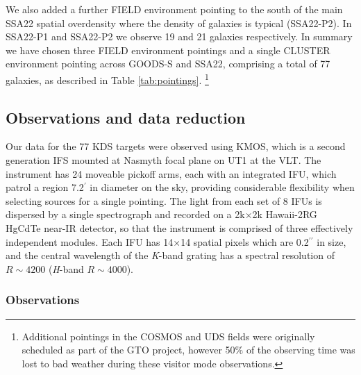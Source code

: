 \documentclass[fleqn,usenatbib]{mn2e}
\begin{document}
We also added a further FIELD environment pointing to the south of the main SSA22 spatial overdensity where the density of galaxies is typical (SSA22-P2).
In SSA22-P1 and SSA22-P2 we observe 19 and 21 galaxies respectively.
In summary we have chosen three FIELD environment pointings and a single CLUSTER environment pointing across GOODS-S and SSA22, comprising a total of 77 galaxies, as described in Table \ref{tab:pointings}. \footnote{Additional pointings in the COSMOS and UDS fields were originally scheduled as part of the GTO project, however 50$\%$ of the observing time was lost to bad weather during these visitor mode observations.}

\subsection{Observations and data reduction}\label{subsubsec:observations_and_dr}

Our data for the 77 KDS targets were observed using KMOS, which is a second generation IFS mounted at Nasmyth focal plane on UT1 at the VLT.
The instrument has 24 moveable pickoff arms, each with an integrated IFU, which patrol a region 7.2$^{\prime}$ in diameter on the sky, providing considerable flexibility when selecting sources for a single pointing.
The light from each set of 8 IFUs is dispersed by a single spectrograph and recorded on a 2k$\times$2k Hawaii-2RG HgCdTe near-IR detector, so that the instrument is comprised of three effectively independent modules.
Each IFU has 14$\times$14 spatial pixels which are 0.2$^{\prime\prime}$ in size, and the central wavelength of the {\it K}-band grating has a spectral resolution of $R \sim 4200$ ({\it H}-band $R \sim 4000$).
\subsubsection{Observations}\label{subsubsec:Obs}
\end{document}
